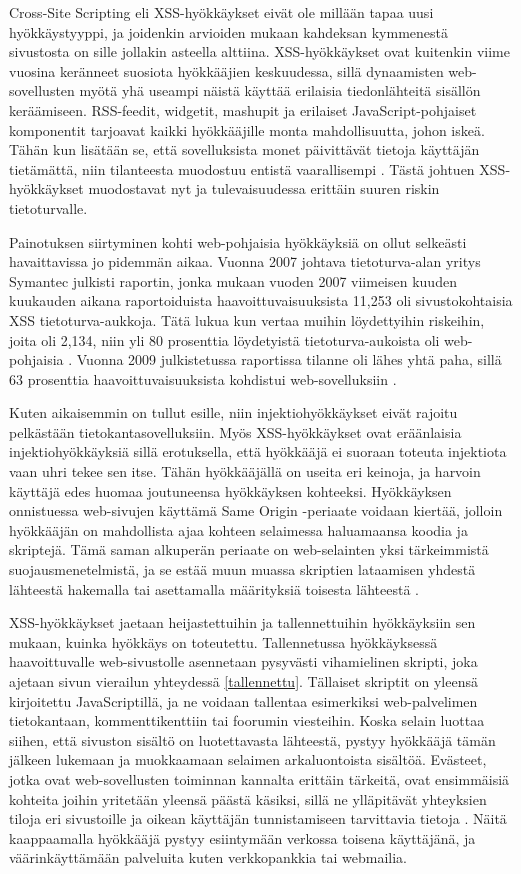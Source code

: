 Cross-Site Scripting eli XSS-hyökkäykset eivät ole millään tapaa uusi hyökkäystyyppi, ja joidenkin arvioiden mukaan kahdeksan kymmenestä sivustosta on 
sille jollakin asteella alttiina. XSS-hyökkäykset ovat kuitenkin viime vuosina keränneet suosiota hyökkääjien keskuudessa, sillä dynaamisten web-sovellusten
myötä yhä useampi näistä käyttää erilaisia tiedonlähteitä sisällön keräämiseen. RSS-feedit, widgetit, mashupit ja erilaiset JavaScript-pohjaiset komponentit 
tarjoavat kaikki hyökkääjille monta mahdollisuutta, johon iskeä. Tähän kun lisätään se, että sovelluksista monet päivittävät tietoja käyttäjän tietämättä, 
niin tilanteesta muodostuu entistä vaarallisempi \cite{WEB2b}. Tästä johtuen XSS-hyökkäykset muodostavat nyt ja tulevaisuudessa erittäin suuren riskin
tietoturvalle.

Painotuksen siirtyminen kohti web-pohjaisia hyökkäyksiä on ollut selkeästi havaittavissa jo pidemmän aikaa. Vuonna 2007 johtava tietoturva-alan 
yritys Symantec julkisti raportin, jonka  mukaan vuoden 2007 viimeisen kuuden kuukauden aikana raportoiduista haavoittuvaisuuksista 11,253
oli sivustokohtaisia XSS tietoturva-aukkoja. Tätä lukua kun vertaa muihin löydettyihin riskeihin, joita oli 2,134, niin 
yli 80 prosenttia löydetyistä tietoturva-aukoista oli web-pohjaisia \cite{SYM}. Vuonna 2009 julkistetussa raportissa tilanne oli lähes yhtä paha, 
sillä 63 prosenttia haavoittuvaisuuksista kohdistui web-sovelluksiin \cite{SYM2}.

Kuten aikaisemmin on tullut esille, niin injektiohyökkäykset eivät rajoitu pelkästään tietokantasovelluksiin. Myös XSS-hyökkäykset ovat eräänlaisia 
injektiohyökkäyksiä sillä erotuksella, että hyökkääjä ei suoraan toteuta injektiota vaan uhri tekee sen itse. Tähän hyökkääjällä on useita eri 
keinoja, ja harvoin käyttäjä edes huomaa joutuneensa hyökkäyksen kohteeksi. Hyökkäyksen onnistuessa web-sivujen käyttämä Same Origin -pe\-ri\-aa\-te 
voidaan kiertää, jolloin hyökkääjän on mahdollista ajaa kohteen selaimessa haluamaansa koodia ja skriptejä. Tämä saman alkuperän periaate on web-selainten 
yksi tärkeimmistä suojausmenetelmistä, ja se estää muun muassa skriptien lataamisen yhdestä lähteestä hakemalla tai asettamalla määrityksiä toisesta lähteestä \cite{WEB2}.

XSS-hyökkäykset jaetaan heijastettuihin ja tallennettuihin hyökkäyksiin sen mukaan, kuinka hyökkäys on toteutettu. Tallennetussa hyökkäyksessä haavoittuvalle 
web-sivustolle asennetaan pysyvästi vihamielinen skripti, joka ajetaan sivun vierailun yhteydessä \ref{tallennettu}. Tällaiset skriptit on yleensä kirjoitettu JavaScriptillä,
ja ne voidaan tallentaa esimerkiksi web-palvelimen tietokantaan, kommenttikenttiin tai foorumin viesteihin. Koska selain luottaa siihen, 
että sivuston sisältö on luotettavasta lähteestä, pystyy hyökkääjä tämän jälkeen lukemaan ja muokkaamaan selaimen arkaluontoista sisältöä. Evästeet, jotka ovat web-sovellusten 
toiminnan kannalta erittäin tärkeitä, ovat ensimmäisiä kohteita joihin yritetään yleensä päästä käsiksi, sillä ne ylläpitävät yhteyksien tiloja eri 
sivustoille ja oikean käyttäjän tunnistamiseen tarvittavia tietoja \cite{WEB2b}. Näitä kaappaamalla hyökkääjä pystyy esiintymään verkossa toisena käyttäjänä, 
ja väärinkäyttämään palveluita kuten verkkopankkia tai webmailia. 

